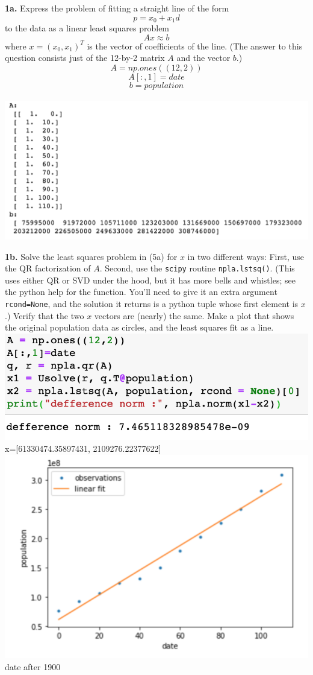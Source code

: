 \documentclass[11pt]{article}
\begin{document}
\par\medskip
{\bf 1a.}
Express the problem of fitting a straight line of the form
$$ p = x_0 + x_1d$$
to the data as a linear least squares problem
$$A x \approx b$$
where $x = (x_0, x_1)^T$ is the vector of coefficients of the line.
(The answer to this question consists just of the 12-by-2 matrix $A$ 
and the vector $b$.)$$
A = np.ones((12,2))$$$$
A[:,1]=date
$$$$b = population$$\\
\includegraphics[scale = 0.4]{h51a2}
\par\medskip
{\bf 1b.}
Solve the least squares problem in (5a) for $x$ in two different ways:
First, use the QR factorization of $A$.
Second, use the {\tt scipy} routine {\tt npla.lstsq()}.
(This uses either QR or SVD under the hood, but it has more
bells and whistles; see the python help for the function.
You'll need to give it an extra argument {\tt rcond=None},
and the solution it returns is a python tuple whose first element is $x$.)
Verify that the two $x$ vectors are (nearly) the same.
Make a plot that shows the original population data as circles,
and the least squares fit as a line.\\
\includegraphics[scale = 0.7]{h51b.png}\\
x=[61330474.35897431, 2109276.22377622]\\
\includegraphics{h51c2.png}date after 1900
\end{document}
